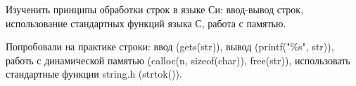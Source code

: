 \documentclass[12pt,a4paper]{article}
\begin{document}
\maketitle



\labheading



\begin{labgoal}
Изученить принципы обработки строк в языке Си: ввод-вывод строк, использование стандартных функций языка С, работа с памятью.
\end{labgoal}



\labreport




\begin{labconclusion}
Попробовали на практике строки: ввод (gets(str)), вывод (printf("\%s", str)), работь с динамической памятью (calloc(n, sizeof(char)), free(str)), использовать стандартные функции string.h (strtok()).
\end{labconclusion}
\end{document}
